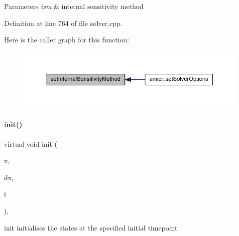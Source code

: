 \begin{DoxyParams}{Parameters}
{\em ism} & internal sensitivity method \\
\hline
\end{DoxyParams}


Definition at line 764 of file solver.\+cpp.

Here is the caller graph for this function\+:
\nopagebreak
\begin{figure}[H]
\begin{center}
\leavevmode
\includegraphics[width=350pt]{classamici_1_1_solver_ab114a079f23232a521ad2e81a0a30e36_icgraph}
\end{center}
\end{figure}
\mbox{\label{classamici_1_1_solver_a566d267fa2815fe0dd3c29d44f68209b}} 
\paragraph{\texorpdfstring{init()}{init()}}
{\footnotesize\ttfamily virtual void init (\begin{DoxyParamCaption}\item[{\mbox{\hyperlink{classamici_1_1_ami_vector}{Ami\+Vector}} $\ast$}]{x,  }\item[{\mbox{\hyperlink{classamici_1_1_ami_vector}{Ami\+Vector}} $\ast$}]{dx,  }\item[{\mbox{\hyperlink{namespaceamici_a1bdce28051d6a53868f7ccbf5f2c14a3}{realtype}}}]{t }\end{DoxyParamCaption})\hspace{0.3cm}{\ttfamily [protected]}, {}}

init initialises the states at the specified initial timepoint


